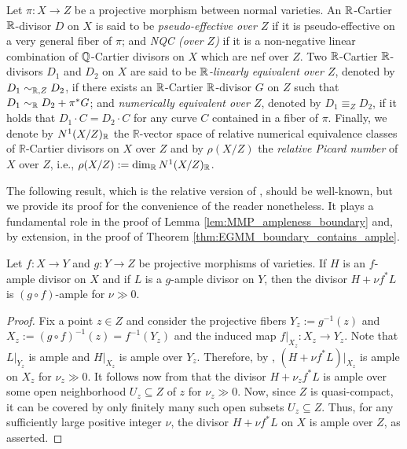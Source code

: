 	Let $ \pi \colon X\to Z $ be a projective morphism between normal varieties. An $ \mathbb{R} $-Cartier $ \mathbb{R} $-divisor $ D $ on $ X $ is said to be \emph{pseudo-effective over $ Z $} if it is pseudo-effective on a very general fiber of $ \pi $; and \emph{NQC (over $ Z $)} \cite{HanLi22} if it is a non-negative linear combination of $\mathbb{Q}$-Cartier divisors on $X$ which are nef over $ Z $. Two $ \mathbb{R} $-Cartier $ \mathbb{R} $-divisors $ D_1 $ and $ D_2 $ on $ X $ are said to be \emph{$\mathbb{R}$-linearly equivalent over $ Z $}, denoted by $ D_1 \sim_{\mathbb{R},Z} D_2 $, if there exists an $\mathbb{R}$-Cartier $\mathbb{R}$-divisor $G$ on $Z$ such that $D_1\sim_{\mathbb{R}} D_2+\pi^*G$; and \emph{numerically equivalent over $ Z $}, denoted by $ D_1 \equiv_Z D_2 $, if it holds that $ D_1\cdot C = D_2 \cdot C $ for any curve $ C $ contained in a fiber of $ \pi $. Finally, we denote by $ N^1(X/Z)_{\mathbb{R}} $ the $\mathbb{R}$-vector space of relative numerical equivalence classes of $\mathbb{R}$-Cartier divisors on $ X $ over $ Z $
	and by $ \rho(X/Z) $ the \emph{relative Picard number} of $ X $ over $ Z $, i.e., $  \rho(X/Z) := \dim_{\mathbb{R}} N^1(X/Z)_{\mathbb{R}} $.
	
	\medskip
	
	The following result, which is the relative version of \cite[Proposition 1.45]{KM98}, should be well-known, but we provide its proof for the convenience of the reader nonetheless. It plays a fundamental role in the proof of Lemma \ref{lem:MMP_ampleness_boundary} and, by extension, in the proof of Theorem \ref{thm:EGMM_boundary_contains_ample}.
	
	\begin{lem}\label{lem:KM98_1.45_relative}
		Let $ f \colon X \to Y $ and $ g \colon Y \to Z $ be projective morphisms of varieties. If $ H $ is an $f$-ample divisor on $X$ and if $ L $ is a $g$-ample divisor on $Y$, then the divisor $ H + \nu f^* L$ is $(g \circ f)$-ample for $ \nu \gg 0 $.
	\end{lem}
	
	\begin{proof}
		Fix a point $ z \in Z $ and consider the projective fibers $ Y_z := g^{-1}(z) $ and $ X_z := (g \circ f)^{-1}(z) = f^{-1}(Y_z) $ and the induced map $ f |_{X_z} \colon X_z \to Y_z $. Note that $ L |_{Y_z} $ is ample and $ H |_{X_z} $ is ample over $ Y_z $. Therefore, by \cite[Proposition 1.45]{KM98}, $ (H + \nu f^*L) |_{X_z} $ is ample on $X_z$ for $ \nu_z \gg 0 $. It follows now from \cite[Proposition 1.41]{KM98} that the divisor $ H + \nu_z f^*L $ is ample over some open neighborhood $ U_z \subseteq Z $ of $z$ for $ \nu_z \gg 0 $. 
		Now, since $ Z $ is quasi-compact, it can be covered by only finitely many such open subsets $ U_z \subseteq Z $. Thus, for any sufficiently large positive integer $ \nu $, the divisor $ H + \nu f^*L $ on $X$ is ample over $ Z $, as asserted.
	\end{proof}
	

